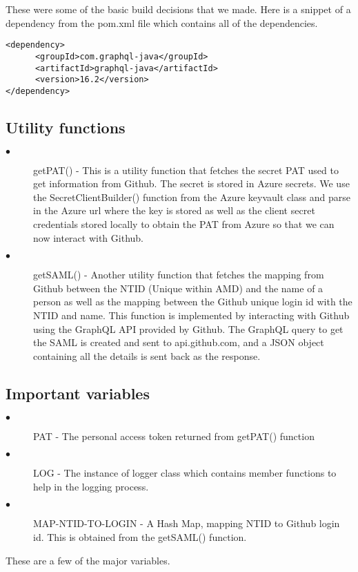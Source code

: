 These were some of the basic build decisions that we made.
Here is a snippet of a dependency from the pom.xml file which contains all of the dependencies.

\begin{lstlisting}[breaklines]
<dependency>
      <groupId>com.graphql-java</groupId>
      <artifactId>graphql-java</artifactId>
      <version>16.2</version>
</dependency>
\end{lstlisting}

\subsection{Utility functions}

\begin{description}

\item[$\bullet$] getPAT() - This is a utility function that fetches the secret PAT used to get information from Github. The secret is stored in Azure secrets. We use the SecretClientBuilder() function from the Azure keyvault class and parse in the Azure url where the key is stored as well as the client secret credentials stored locally to obtain the PAT from Azure so that we can now interact with Github.

\item[$\bullet$] getSAML() - Another utility function that fetches the mapping from Github between the NTID (Unique within AMD) and the name of a person as well as the mapping between the Github unique login id with the NTID and name. This function is implemented by interacting with Github using the GraphQL API provided by Github. The GraphQL query to get the SAML is created and sent to api.github.com, and a JSON object containing all the details is sent back as the response.


\end{description}

\subsection{Important variables}

\begin{description}

\item[$\bullet$] PAT - The personal access token returned from getPAT() function

\item[$\bullet$] LOG - The instance of logger class which contains member functions to help in the logging process.

\item[$\bullet$] MAP-NTID-TO-LOGIN - A Hash Map, mapping NTID to Github login id. This is obtained from the getSAML() function.

\end{description}
These are a few of the major variables.

